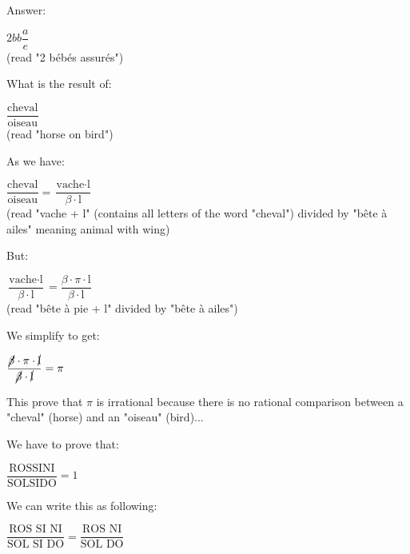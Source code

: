 	Answer: 
	\begin{center}
		$2bb \dfrac{a}{e}$\\
		(read "2 bébés assurés")
	\end{center} 
	\begin{center}\underline{\hspace{5 cm}}\end{center}
	
	What is the result of: 
	\begin{center}
	 $\dfrac{\text{cheval}}{\text{oiseau}}$\\
	(read "horse on bird")
	 \end{center} 
	
	As we have: 
	\begin{center}
	 $\dfrac{\text{cheval}}{\text{oiseau}}=\dfrac{\text{vache} \cdot \text{l}}{\beta \cdot \text{l}}$\\
	(read "vache + l" (contains all letters of the word "cheval") divided by "bête à ailes" meaning animal with wing) 
	 \end{center} 
	
	But: 
	\begin{center}
	 $\dfrac{\text{vache} \cdot \text{l}}{\beta \cdot \text{l}}=\dfrac{\beta \cdot \pi \cdot \text{l}}{\beta \cdot \text{l}}$\\
	(read "bête à pie + l" divided by "bête à ailes")  
	 \end{center}
	
	We simplify to get: 
	\begin{center}
	 $\dfrac{\cancel{\beta} \cdot \pi \cdot \cancel{\text{l}}}{\cancel{\beta} \cdot \cancel{\text{l}}}=\pi$  
	 \end{center}
	
	This prove that $\pi$ is irrational because there is no rational comparison between a "cheval" (horse) and an "oiseau" (bird)... 
		\begin{center}\underline{\hspace{5 cm}}\end{center}
	\pagebreak
	We have to prove that:
	\begin{center}
	$\dfrac{\text{ROSSINI}}{\text{SOLSIDO}}=1$  
	\end{center} 
	
	We can write this as following:
	\begin{center}
	$\dfrac{\text{ROS SI NI}}{\text{SOL SI DO}}=\dfrac{\text{ROS NI}}{\text{SOL DO}}$  
	\end{center}
	

